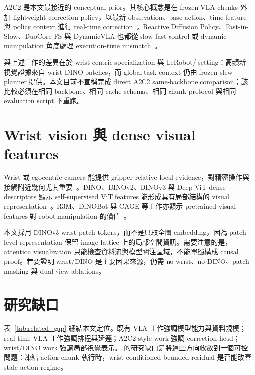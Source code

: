 A2C2 是本文最接近的 conceptual prior。其核心概念是在 frozen VLA chunks 外加 lightweight correction policy，以最新 observation、base action、time feature 與 policy context 進行 real-time correction~\cite{sendai2025a2c2}。Reactive Diffusion Policy、Fast-in-Slow、DuoCore-FS 與 DynamicVLA 也都從 slow-fast control 或 dynamic manipulation 角度處理 execution-time mismatch~\cite{xue2025rdp,chen2025fastinslow,zou2025duocorefs,xie2026dynamicvla}。

\method{} 與上述工作的差異在於 wrist-centric specialization 與 LeRobot/\smolvla{} setting：高頻新視覺證據來自 wrist DINO patches，而 global task context 仍由 frozen slow planner 提供。本文目前不宣稱完成 direct A2C2 same-backbone comparison；該比較必須在相同 backbone、相同 cache schema、相同 chunk protocol 與相同 evaluation script 下重跑。

\section{Wrist vision 與 dense visual features}

Wrist 或 egocentric camera 能提供 gripper-relative local evidence，對精密操作與接觸附近幾何尤其重要~\cite{jangir2022lookcloser,chuang2024activevision}。DINO、DINOv2、DINOv3 與 Deep ViT dense descriptors 顯示 self-supervised ViT features 能形成具有局部結構的 visual representation~\cite{caron2021dino,oquab2023dinov2,simeoni2025dinov3,amir2021densevit}。R3M、DINOBot 與 CAGE 等工作亦顯示 pretrained visual features 對 robot manipulation 的價值~\cite{nair2023r3m,dipalo2024dinobot,xia2024cage}。

本文採用 DINOv3 wrist patch tokens，而不是只取全圖 embedding，因為 patch-level representation 保留 image lattice 上的局部空間資訊。需要注意的是，attention visualization 只能檢查資料流與模型關注區域，不能單獨構成 causal proof。若要證明 wrist/DINO 是主要因果來源，仍需 no-wrist、no-DINO、patch masking 與 dual-view ablations。

\section{研究缺口}

表~\ref{tab:related_gap} 總結本文定位。既有 VLA 工作強調模型能力與資料規模；real-time VLA 工作強調排程與延遲；A2C2-style work 強調 correction head；wrist/DINO work 強調局部視覺表示。\method{} 的研究缺口是將這些方向收斂到一個可控問題：凍結 \smolvla{} action chunk 執行時，wrist-conditioned bounded residual 是否能改善 stale-action regime。


